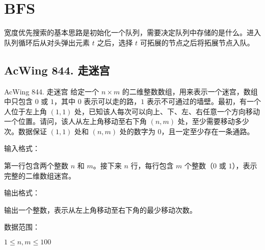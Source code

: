 \section{BFS}

宽度优先搜索的基本思路是初始化一个队列，需要决定队列中存储的是什么。进入队列循环后从对头弹出元素 $t$ 之后，选择 $t$ 可拓展的节点之后将拓展节点入队。

\subsection{AcWing 844. 走迷宫}
\begin{titledbox}{AcWing 844. 走迷宫}
    给定一个 $n \times m$ 的二维整数数组，用来表示一个迷宫，数组中只包含 $0$ 或 $1$，其中 $0$ 表示可以走的路，$1$ 表示不可通过的墙壁。最初，有一个人位于左上角 $(1, 1)$ 处，已知该人每次可以向上、下、左、右任意一个方向移动一个位置。请问，该人从左上角移动至右下角 $(n, m)$ 处，至少需要移动多少次。数据保证 $(1, 1)$ 处和 $(n, m)$ 处的数字为 $0$，且一定至少存在一条通路。

    输入格式：

    第一行包含两个整数 $n$ 和 $m$。接下来 $n$ 行，每行包含 $m$ 个整数（$0$ 或 $1$），表示完整的二维数组迷宫。

    输出格式：

    输出一个整数，表示从左上角移动至右下角的最少移动次数。

    数据范围：

    $1 \le n, m \le 100$

    \begin{inputblock}
         \\
         \\
         \\
         \\
         \\
    \end{inputblock}
    \begin{outputblock}
    \end{outputblock}
\end{titledbox}

